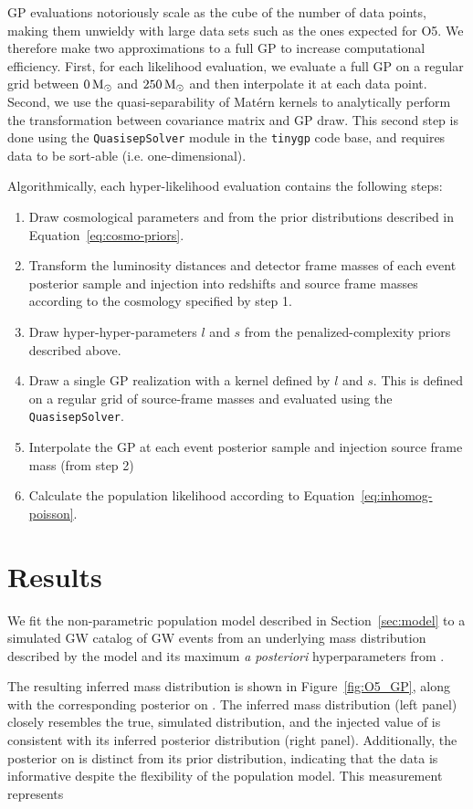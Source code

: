 \documentclass[]{aastex631}
\begin{document}
GP evaluations notoriously scale as the cube of the number of data points, making them unwieldy with large data sets such as the ones expected for O5.
We therefore make two approximations to a full GP to increase computational efficiency.
First, for each likelihood evaluation, we evaluate a full GP on a regular grid between $0\,\text{M}_{\odot}$ and $250\,\text{M}_{\odot}$ and then interpolate it at each data point.
Second, we use the quasi-separability of Mat\'ern kernels to analytically perform the transformation between covariance matrix and GP draw.
This second step is done using the \texttt{QuasisepSolver} module \citep{foreman-mackey_fast_2017} in the \texttt{tinygp} code base, and requires data to be sort-able (i.e. one-dimensional).

Algorithmically, each hyper-likelihood evaluation contains the following steps:
\begin{enumerate}
    \item Draw cosmological parameters \Ho{} and \Omm{} from the prior distributions described in Equation~\ref{eq:cosmo-priors}.
    \item Transform the luminosity distances and detector frame masses of each event posterior sample and injection into redshifts and source frame masses according to the cosmology specified by step 1.
    \item Draw hyper-hyper-parameters $l$ and $s$ from the penalized-complexity priors described above.
    \item Draw a single GP realization with a kernel defined by $l$ and $s$. This is defined on a regular grid of source-frame masses and evaluated using the \texttt{QuasisepSolver}.
    \item Interpolate the GP at each event posterior sample and injection source frame mass (from step 2)
    \item Calculate the population likelihood according to Equation~\ref{eq:inhomog-poisson}.
\end{enumerate}

\section{Results}
\label{sec:results}
We fit the non-parametric population model described in Section~\ref{sec:model} to a simulated GW catalog of  GW events from an underlying mass distribution described by the \plp{} model and its maximum \emph{a posteriori} hyperparameters from \citet{o3b_pop}.

The resulting inferred mass distribution is shown in Figure~\ref{fig:O5_GP}, along with the corresponding posterior on \Ho.
The inferred mass distribution (left panel) closely resembles the true, simulated distribution, and the injected value of \Ho is consistent with its inferred posterior distribution (right panel).
Additionally, the posterior on \Ho is distinct from its prior distribution, indicating that the data is informative despite the flexibility of the population model.
This measurement represents 
\end{document}
